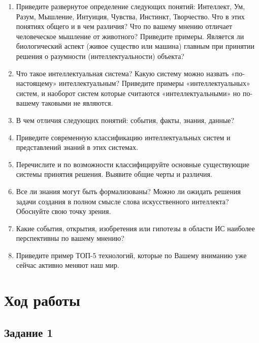 \documentclass[14pt,a4paper,report]{report}
\begin{document}
\begin{enumerate}
	\item Приведите развернутое определение следующих понятий: Интеллект, Ум, Разум, Мышление, Интуиция, Чувства, Инстинкт, Творчество. Что в этих понятиях общего и в чем различия? Что по вашему мнению отличает человеческое мышление от животного? Приведите
	примеры. Является ли биологический аспект (живое существо или машина) главным при принятии
	решения о разумности (интеллектуальности) объекта?
	
	\item Что такое интеллектуальная система? Какую систему можно назвать «по-настоящему»
	интеллектуальным? Приведите примеры «интеллектуальных» систем, и наоборот систем
	которые считаются «интеллектуальными» но по-вашему таковыми не являются.
	
	\item В чем отличия следующих понятий: события, факты, знания, данные?
	
	\item Приведите современную классификацию интеллектуальных систем и представлений знаний
	в этих системах.
	
	\item Перечислите и по возможности классифицируйте основные существующие системы принятия решения. Выявите общие черты и различия.
	
	\item Все ли знания могут быть формализованы? Можно ли ожидать решения задачи создания в
	полном смысле слова искусственного интеллекта? Обоснуйте свою точку зрения.
	
	\item Какие события, открытия, изобретения или гипотезы в области ИС наиболее перспективны по вашему мнению?
	
	\item Приведите пример ТОП-5 технологий, которые по Вашему вниманию уже сейчас активно
	меняют наш мир.
\end{enumerate}

\clearpage

\section{Ход работы}

\subsection{Задание 1}
\end{document}
